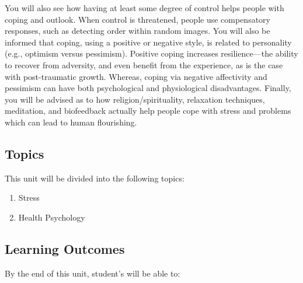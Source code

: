 \documentclass[
]{book}
\providecommand{\tightlist}{%
  \setlength{\itemsep}{0pt}\setlength{\parskip}{0pt}}
\begin{document}
You will also see how having at least some degree of control helps people with coping and outlook. When control is threatened, people use compensatory responses, such as detecting order within random images. You will also be informed that coping, using a positive or negative style, is related to personality (e.g., optimism versus pessimism). Positive coping increases resilience---the ability to recover from adversity, and even benefit from the experience, as is the case with post-traumatic growth. Whereas, coping via negative affectivity and pessimism can have both psychological and physiological disadvantages. Finally, you will be advised as to how religion/spirituality, relaxation techniques, meditation, and biofeedback actually help people cope with stress and problems which can lead to human flourishing.

\hypertarget{topics-7}{%
\subsection*{Topics}\label{topics-7}}

This unit will be divided into the following topics:

\begin{enumerate}
\def\labelenumi{\arabic{enumi}.}
\tightlist
\item
  Stress\\
\item
  Health Psychology
\end{enumerate}

\hypertarget{learning-outcomes-7}{%
\subsection*{Learning Outcomes}\label{learning-outcomes-7}}

By the end of this unit, student's will be able to:
\end{document}
